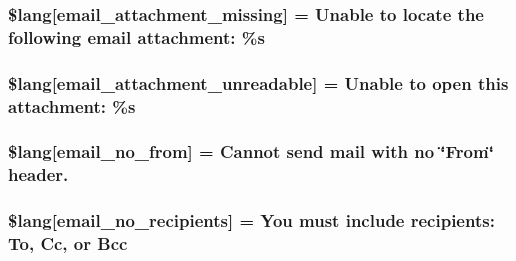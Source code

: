 \subsubsection[{\$lang}]{\setlength{\rightskip}{0pt plus 5cm}\$lang\mbox{[}\textquotesingle{}email\+\_\+attachment\+\_\+missing\textquotesingle{}\mbox{]} = \textquotesingle{}Unable to locate the following email attachment\+: \%s\textquotesingle{}}\label{email__lang_8php_a09c0c415b48ef267bf9e36b555be67d9}
\hypertarget{email__lang_8php_acae2e9f7ade1ac9c6b67db0ff752414e}{}
\subsubsection[{\$lang}]{\setlength{\rightskip}{0pt plus 5cm}\$lang\mbox{[}\textquotesingle{}email\+\_\+attachment\+\_\+unreadable\textquotesingle{}\mbox{]} = \textquotesingle{}Unable to open this attachment\+: \%s\textquotesingle{}}\label{email__lang_8php_acae2e9f7ade1ac9c6b67db0ff752414e}
\hypertarget{email__lang_8php_a43fdb34364c17ce52df6c00d9da25f3d}{}
\subsubsection[{\$lang}]{\setlength{\rightskip}{0pt plus 5cm}\$lang\mbox{[}\textquotesingle{}email\+\_\+no\+\_\+from\textquotesingle{}\mbox{]} = \textquotesingle{}Cannot send mail with no \char`\"{}From\char`\"{} header.\textquotesingle{}}\label{email__lang_8php_a43fdb34364c17ce52df6c00d9da25f3d}
\hypertarget{email__lang_8php_a8f9d5a049f4dd899d4e61f6d56be5071}{}
\subsubsection[{\$lang}]{\setlength{\rightskip}{0pt plus 5cm}\$lang\mbox{[}\textquotesingle{}email\+\_\+no\+\_\+recipients\textquotesingle{}\mbox{]} = \textquotesingle{}You must include recipients\+: To, Cc, or Bcc\textquotesingle{}}\label{email__lang_8php_a8f9d5a049f4dd899d4e61f6d56be5071}
\hypertarget{email__lang_8php_a99a2ce89426340b4c96a245b7874a99d}{}
